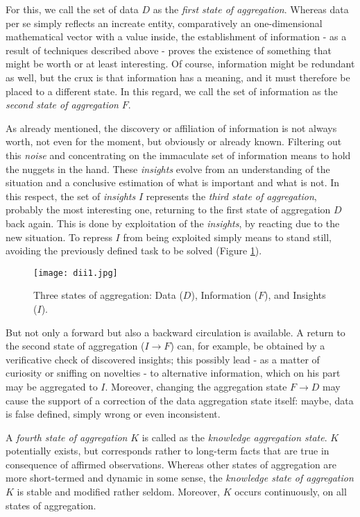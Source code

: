 \documentclass[10pt,latex8]{article}
\begin{document}
For this, we call the set of data $D$ as the \textit{first state of aggregation}. Whereas data per se simply reflects an increate entity, comparatively an one-dimensional mathematical vector with a value inside, the establishment of information - as a result of techniques described above - proves the existence of something that might be worth or at least interesting. Of course,  information might be redundant as well, but the crux is that information has a meaning, and it must therefore be placed to a different state. In this regard, we call the set of information as the \textit{second state of aggregation} $F$.

As already mentioned, the discovery or affiliation of information is not always worth, not even for the moment, but obviously or already known. Filtering out this \textit{noise} and concentrating on the immaculate set of information means to hold the nuggets in the hand. These \textit{insights} evolve from an understanding of the situation and a conclusive estimation of what is important and what is not. In this respect, the set of \textit{insights} $I$ represents the \textit{third state of aggregation}, probably the most interesting one, returning to the first state of aggregation $D$ back again. This is done by exploitation of the \textit{insights}, by reacting due to the new situation. To repress $I$ from being exploited simply means to stand still, avoiding the previously defined task to be solved (Figure \ref{fig:dii1}).

\begin{figure}[htbp]
   \centering
   \texttt{[image: dii1.jpg]} 
   \caption{Three states of aggregation: Data ($D$), Information ($F$), and Insights ($I$).}
   \label{fig:dii1}
\end{figure}

But not only a forward but also a backward circulation is available. A return to the second state of aggregation ($I\rightarrow F$) can, for example, be obtained by a verificative check of discovered insights; this possibly lead - as a matter of curiosity or sniffing on novelties - to alternative information, which on his part may be aggregated to $I$. Moreover, changing the aggregation state $F\rightarrow D$ may cause the support of a correction of the data aggregation state itself: maybe, data is false defined, simply wrong or even inconsistent.

A \textit{fourth state of aggregation} $K$ is called as the \textit{knowledge aggregation state}. $K$ potentially exists, but corresponds rather to long-term facts that are true in consequence of affirmed observations. Whereas other states of aggregation are more short-termed and dynamic in some sense, the \textit{knowledge state of aggregation} $K$ is stable and modified rather seldom. Moreover, $K$ occurs continuously, on all states of aggregation.
\end{document}
